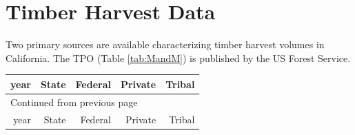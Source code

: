 \documentclass[a4paper,titlepage]{article}
\begin{document}
\section{Timber Harvest Data}
\label{sec:orgheadline4}

Two primary sources are available characterizing timber harvest volumes in California.  The \ac{TPO} (Table \ref{tab:MandM}) is published by the US Forest Service. 

\begin{longtable}{rrrrr}
year & State & Federal & Private & Tribal\\
\hline
\endfirsthead
\multicolumn{5}{l}{Continued from previous page} \\
\hline

year & State & Federal & Private & Tribal \\


\end{longtable}
\end{document}
